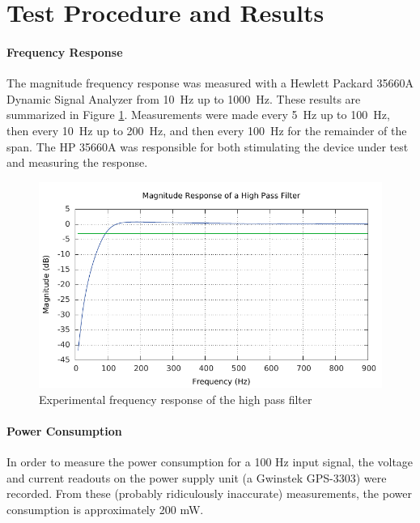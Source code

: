 \documentclass[justified]{tufte-handout}
\begin{document}
\section{Test Procedure and Results}
\paragraph{Frequency Response} The magnitude frequency response was
measured with a Hewlett Packard 35660A Dynamic Signal Analyzer from 10~Hz up to
1000~Hz. These results are summarized in Figure \ref{expRes}. Measurements were
made every 5~Hz up to 100~Hz, then every 10~Hz up to 200~Hz, and then every
100~Hz for the remainder of the span. The HP 35660A was responsible for both
stimulating the device under test and measuring the response.
\begin{figure}
\centering
\label{expRes}
\includegraphics[width=0.9\linewidth]{expResponse.pdf}
\caption{Experimental frequency response of the high pass filter}
\end{figure}
\paragraph{Power Consumption}
In order to measure the power consumption for a 100 Hz input signal, the 
voltage and current readouts on the power supply unit (a Gwinstek GPS-3303) were
recorded. From these (probably ridiculously inaccurate) measurements, the power
consumption is approximately 200 mW.
\end{document}

